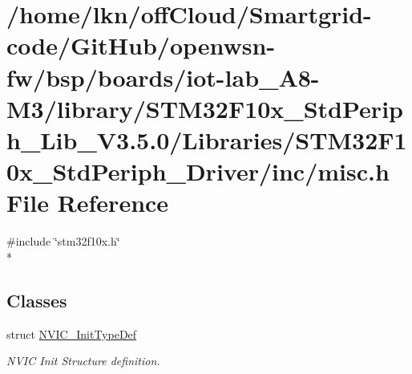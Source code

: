 \hypertarget{iot-lab___a8-_m3_2library_2_s_t_m32_f10x___std_periph___lib___v3_85_80_2_libraries_2_s_t_m32_f10c83060f1a43ea4222dfdbc538c872b4b}{}\section{/home/lkn/off\+Cloud/\+Smartgrid-\/code/\+Git\+Hub/openwsn-\/fw/bsp/boards/iot-\/lab\+\_\+\+A8-\/\+M3/library/\+S\+T\+M32\+F10x\+\_\+\+Std\+Periph\+\_\+\+Lib\+\_\+\+V3.5.0/\+Libraries/\+S\+T\+M32\+F10x\+\_\+\+Std\+Periph\+\_\+\+Driver/inc/misc.h File Reference}
\label{iot-lab___a8-_m3_2library_2_s_t_m32_f10x___std_periph___lib___v3_85_80_2_libraries_2_s_t_m32_f10c83060f1a43ea4222dfdbc538c872b4b}
{\ttfamily \#include \char`\"{}stm32f10x.\+h\char`\"{}}\\*
\subsection*{Classes}
\begin{DoxyCompactItemize}
\item 
struct \hyperlink{struct_n_v_i_c___init_type_def}{N\+V\+I\+C\+\_\+\+Init\+Type\+Def}
\begin{DoxyCompactList}\small\item\em N\+V\+IC Init Structure definition. \end{DoxyCompactList}\end{DoxyCompactItemize}
